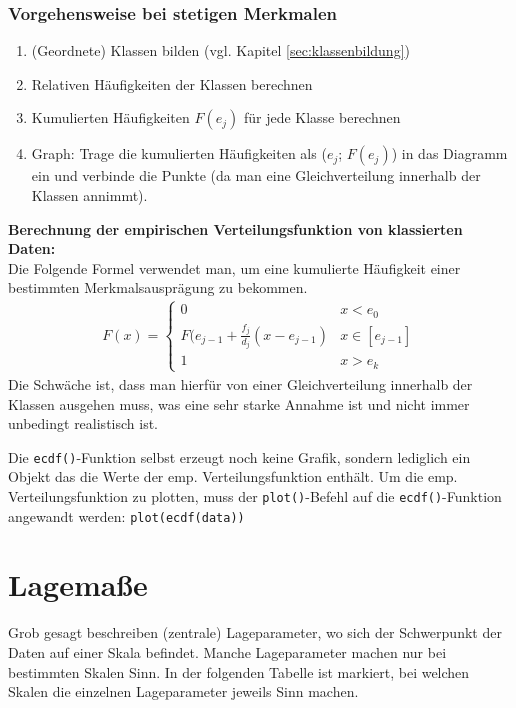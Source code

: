 \documentclass[a4paper]{article}
\newcommand\dangersign{%
 \makebox[1.8em][c]{%
 \makebox[0pt][c]{\raisebox{.15em}{\small!}}%
 \makebox[0pt][c]{\color{red}\Large$\triangle$}}}%
\begin{document}
\subsubsection{Vorgehensweise bei stetigen Merkmalen}
\begin{enumerate}
    \item (Geordnete) Klassen bilden (vgl. Kapitel \ref{sec:klassenbildung})
    \item Relativen Häufigkeiten der Klassen berechnen
    \item Kumulierten Häufigkeiten $F(e_j)$ für jede Klasse berechnen
    \item Graph: Trage die kumulierten Häufigkeiten als ($e_j$; $F(e_j)$) in das Diagramm ein und verbinde die Punkte (da man eine Gleichverteilung innerhalb der Klassen annimmt).
\end{enumerate}
\textbf{Berechnung der empirischen Verteilungsfunktion von klassierten Daten:}\\
Die Folgende Formel verwendet man, um eine kumulierte Häufigkeit einer bestimmten Merkmalsausprägung zu bekommen.
\begin{align*}
    F(x)=\begin{cases}
			0      & x < e_0        \\
            F(e_{j-1}+\frac{f_j}{d_j}(x-e_{j-1}) & x \in[e_{j-1}]\\
            1      &x>e_k
		 \end{cases}
\end{align*}
Die Schwäche ist, dass man hierfür von einer Gleichverteilung innerhalb der Klassen ausgehen muss, was eine sehr starke Annahme ist und nicht immer unbedingt realistisch ist.\\

\noindent {}

\noindent \dangersign Die \texttt{ecdf()}-Funktion selbst erzeugt noch keine Grafik, sondern lediglich ein Objekt das die Werte der emp. Verteilungsfunktion enthält. Um die emp. Verteilungsfunktion zu plotten, muss der \texttt{plot()}-Befehl auf die \texttt{ecdf()}-Funktion angewandt werden: \texttt{plot(ecdf(data))} 

\clearpage


\section{Lagemaße}
Grob gesagt beschreiben (zentrale) Lageparameter, wo sich der Schwerpunkt der Daten auf einer Skala befindet. Manche Lageparameter machen nur bei bestimmten Skalen Sinn. In der folgenden Tabelle ist markiert, bei welchen Skalen die einzelnen Lageparameter jeweils Sinn machen.
\end{document}
